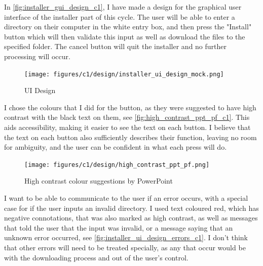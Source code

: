 \documentclass[11pt]{article}
\begin{document}
                In \autoref{fig:installer_gui_design_c1}, I have made a design for the graphical user interface of the installer part of this cycle. The user will be able to enter a directory on their computer in the white entry box, and then press the "Install" button which will then validate this input as well as download the files to the specified folder. The cancel button will quit the installer and no further processing will occur.

                \begin{figure}[!ht]
                    \centering
                    \texttt{[image: figures/c1/design/installer\_ui\_design\_mock.png]}
                    \caption{UI Design}
                    \label{fig:installer_gui_design_c1}
                \end{figure}

                I chose the colours that I did for the button, as they were suggested to have high contrast with the black text on them, see \autoref{fig:high_contrast_ppt_pf_c1}. This aids accessibility, making it easier to see the text on each button. I believe that the text on each button also sufficiently describes their function, leaving no room for ambiguity, and the user can be confident in what each press will do. 

                \begin{figure}[!ht]
                    \centering
                    \texttt{[image: figures/c1/design/high\_contrast\_ppt\_pf.png]}
                    \caption{High contrast colour suggestions by PowerPoint}
                    \label{fig:high_contrast_ppt_pf_c1}
                \end{figure}

                I want to be able to communicate to the user if an error occurs, with a special case for if the user inputs an invalid directory. I used text coloured red, which has negative connotations, that was also marked as high contrast, as well as messages that told the user that the input was invalid, or a message saying that an unknown error occurred, see \autoref{fig:installer_ui_design_errors_c1}. I don't think that other errors will need to be treated specially, as any that occur would be with the downloading process and out of the user's control.
\end{document}
